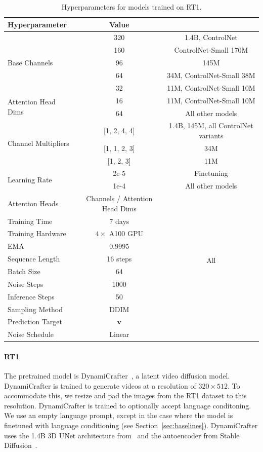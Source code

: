 \begin{table}[ht]
\small
\centering
\caption{Hyperparameters for models trained on RT1.}
\vspace{1mm}
\label{tab:rt1_hyperparameters}
\begin{tabular}{lcc}
\toprule
\textbf{Hyperparameter} & \textbf{Value} \\
\midrule
\multirow{5}{3cm}{Base Channels} & 320 & 1.4B, ControlNet \\
   & 160 & ControlNet-Small 170M \\ 
   & 96 & 145M \\
   & 64 & 34M, ControlNet-Small 38M \\
   & 32 & 11M, ControlNet-Small 10M \\ \hline
\multirow{2}{3cm}{Attention Head Dims} & 16 & 11M, ControlNet-Small 10M   \\ \
                        & 64 & All other models \\ \hline
\multirow{3}{3cm}{Channel Multipliers} & [1, 2, 4, 4] & 1.4B, 145M, all ControlNet variants\\
 & [1, 1, 2, 3] & 34M \\
 & [1, 2, 3] & 11M \\ \hline
\multirow{2}{3cm}{Learning Rate}  & 2e-5 & Finetuning \\
 & 1e-4 & All other models \\ \hline
 \multirow{1}{3cm}{Attention Heads} & Channels / Attention Head Dims & \multirow{10}{0.1cm}{All} \\ 
Training Time & 7 days \\ 
Training Hardware & $4\times$ A100 GPU \\
EMA & 0.9995 \\
Sequence Length & 16 steps \\
Batch Size & 64 \\
Noise Steps & 1000 \\
Inference Steps & 50 \\
Sampling Method & DDIM \\
Prediction Target & $\mathbf{v}$ \\
Noise Schedule & Linear \\
\bottomrule
\end{tabular}
\end{table}

\paragraph{RT1} The pretrained model is DynamiCrafter~\citep{xing2023dynamicrafter}, a latent video diffusion model.
%
DynamiCrafter is trained to generate videos at a resolution of $320 \times 512$. To accommodate this, we resize and pad the images from the RT1 dataset to this resolution.
%
DynamiCrafter is trained to optionally accept language conditoning. We use an empty language prompt, except in the case where the model is finetuned with language conditioning (see Section~\ref{sec:baselines}).
%
DynamiCrafter uses the 1.4B 3D UNet architecture from~\citep{chen2023videocrafter1} and the autoencoder from Stable Diffusion~\citep{rombach2022high}.

